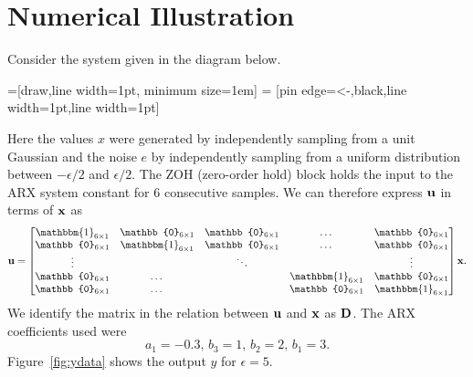 \documentclass{ifacconf}
\newcommand{\xx}{{\bf x}}
\newcommand{\DD}{{\bf D}}
\newcommand{\uu}{{\bf  u}}
\newcommand{\0}{{\bf 0}}
\begin{document}
\section{Numerical Illustration}
Consider the system given in the diagram below. \begin{center}
=[draw,line width=1pt, minimum size=1em]
 = [pin edge={<-,black,line width=1pt},line width=1pt]
\end{center}
\bigskip


Here the values $x$ were generated by independently sampling from a unit Gaussian
and the noise $e$ by independently sampling from  a uniform distribution between
$-\epsilon/2$ and $\epsilon/2$. The
ZOH (zero-order hold) block holds the input to the ARX system constant for 6 consecutive
samples. We can therefore express $\uu$ in terms of $\xx$ as
\begin{equation}
\uu= \begin{bmatrix} \mathbbm{1}_{6\times 1} & \mathbb{0}_{6 \times
    1} &\mathbb{0}_{6\times 1} &\dots &\mathbb{0}_{6\times 1}  \\ \mathbb{0}_{6\times 1} & \mathbbm{1}_{6 \times
    1} &\mathbb{0}_{6\times 1} &\dots & \mathbb{0}_{6\times 1} \\ \vdots &&\ddots & &\vdots \\ \mathbb{0}_{6\times 1} &\dots &&\mathbbm{1}_{6 \times
    1}  & \mathbb{0}_{6 \times   1}
\\
  \mathbb{0}_{6\times 1} &\dots & &\mathbb{0}_{6\times 1} & \mathbbm{1}_{6 \times
    1} \end{bmatrix} \xx.
\end{equation}We identify the matrix in the relation between $\uu$ and
$\xx$ as $\DD$. 
The ARX coefficients used were  
\begin{equation} a_1=-0.3,\, b_3=1,\, b_2=2, \,b_1=3.\end{equation} 
Figure~\ref{fig:ydata}  shows the output $y$ for $\epsilon =5$. 
\end{document}
